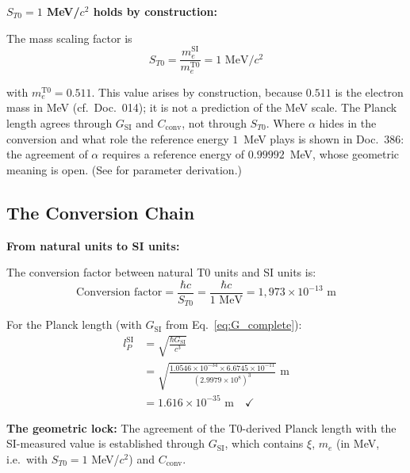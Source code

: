 	\begin{keyresult}
		\textbf{$S_{T0} = 1$ MeV/$c^2$ holds by construction:}
		
		The mass scaling factor is
		\begin{equation}
			\boxed{S_{T0} = \frac{m_e^{\text{SI}}}{m_e^{\text{T0}}} = 1 \text{ MeV}/c^2}
		\end{equation}
		
		with $m_e^{\text{T0}} = 0.511$. This value arises by construction, because $0.511$ is the electron mass in MeV (cf.\ Doc.~014); it is not a prediction of the MeV scale. The Planck length agrees through $G_{\text{SI}}$ and $C_{\text{conv}}$, not through $S_{T0}$. Where $\alpha$ hides in the conversion and what role the reference energy $1$~MeV plays is shown in Doc.~386: the agreement of $\alpha$ requires a reference energy of $0.99992$~MeV, whose geometric meaning is open. (See \cite{parameter_derivation_En} for parameter derivation.)
	\end{keyresult}
	
	\subsection{The Conversion Chain}
	
	\begin{derivation}
		\textbf{From natural units to SI units:}
		
		The conversion factor between natural T0 units and SI units is:
		\begin{equation}
			\text{Conversion factor} = \frac{\hbar c}{S_{T0}} = \frac{\hbar c}{1 \text{ MeV}} = 1{,}973 \times 10^{-13} \text{ m}
		\end{equation}
		
		For the Planck length (with $G_{\text{SI}}$ from Eq.~\eqref{eq:G_complete}):
		\begin{align}
			l_P^{\text{SI}} &= \sqrt{\frac{\hbar G_{\text{SI}}}{c^3}} \\
			&= \sqrt{\frac{1.0546 \times 10^{-34} \times 6.6745 \times 10^{-11}}{(2.9979 \times 10^{8})^3}} \text{ m} \\
			&= 1.616 \times 10^{-35} \text{ m} \quad \checkmark
		\end{align}
		
		\textbf{The geometric lock:} The agreement of the T0-derived Planck length with the SI-measured value is established through $G_{\text{SI}}$, which contains $\xi$, $m_e$ (in MeV, i.e.\ with $S_{T0} = 1$ MeV/$c^2$) and $C_{\text{conv}}$.
	\end{derivation}
	
